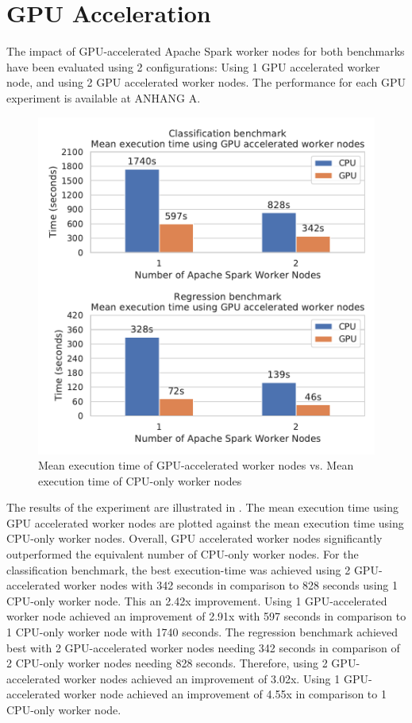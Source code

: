 \section{GPU Acceleration}
The impact of GPU-accelerated Apache Spark worker nodes for both benchmarks have been evaluated using 2 configurations: Using 1 GPU accelerated worker node, and using 2 GPU accelerated worker nodes.
%
The performance for each GPU experiment is available at ANHANG A.
\begin{figure}[h]
\centering
\includegraphics[scale=0.9]{images/07_evaluation/overall_cpu_vs_gpu}
\caption{Mean execution time of GPU-accelerated worker nodes vs. Mean execution time of CPU-only worker nodes}
\label{fig:07_gpu_results}
\end{figure}
The results of the experiment are illustrated in .
The mean execution time using GPU accelerated worker nodes are plotted against the mean execution time using CPU-only worker nodes.
Overall, GPU accelerated worker nodes significantly outperformed the equivalent number of CPU-only worker nodes.
For the classification benchmark, the best execution-time was achieved using 2 GPU-accelerated worker nodes with 342 seconds in comparison to 828 seconds using 1 CPU-only worker node. This an 2.42x improvement. Using 1 GPU-accelerated worker node achieved an improvement of 2.91x with 597 seconds in comparison to 1 CPU-only worker node with 1740 seconds.
The regression benchmark achieved best with 2 GPU-accelerated worker nodes needing 342 seconds in comparison of 2 CPU-only worker nodes needing 828 seconds. Therefore, using 2 GPU-accelerated worker nodes achieved an improvement of 3.02x. Using 1 GPU-accelerated worker node achieved an improvement of 4.55x in comparison to 1 CPU-only worker node.

